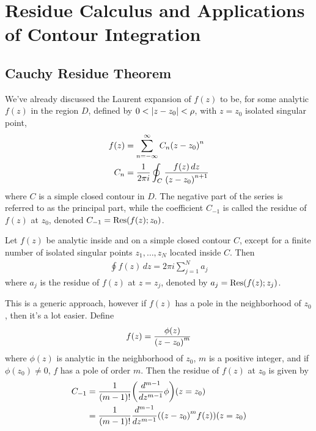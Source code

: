 \section{Residue Calculus and Applications of Contour Integration}
    \subsection{Cauchy Residue Theorem}
    We've already discussed the Laurent expansion of $f(z)$ to be, for some
    analytic $f(z)$ in the region $D$, defined by $0 < \left\lvert z - z_0 \right\rvert < \rho$,
    with $z=z_0$ isolated singular point,
    \begin{align*}
        f(z) &= \sum_{n=-\infty}^\infty C_n {\left( z - z_0 \right)}^n\\
        C_n &= \frac{1}{2\pi i} \oint_C \frac{f(z) \, dz}{{\left( z - z_0 \right)}^{n+1}}
    \end{align*}
    where $C$ is a simple closed contour in $D$. The negative part of the series
    is referred to as the principal part, while the coefficient $C_{-1}$ is
    called the residue of $f(z)$ at $z_0$, denoted $C_{-1} =
    \text{Res}{\left( f(z); z_0 \right)}$.
    \begin{thm}
        Let $f(z)$ be analytic inside and on a simple closed contour $C$, except
        for a finite number of isolated singular points $z_1, \ldots, z_N$
        located inside $C$. Then
        \begin{align*}
            \oint f(z) \, dz = 2 \pi i \sum_{j=1}^N a_j
        \end{align*}
        where $a_j$ is the residue of $f(z)$ at $z=z_j$, denoted by $a_j =
        \text{Res}{\left( f(z); z_j \right)}$.
    \end{thm}
    This is a generic approach, however if $f(z)$ has a pole in the neighborhood
    of $z_0$, then it's a lot easier. Define
    \begin{align*}
        f(z)=\frac{\phi(z)}{{\left( z-z_0 \right)}^m}
    \end{align*}
    where $\phi(z)$ is analytic in the neighborhood of $z_0$, $m$ is a positive
    integer, and if $\phi(z_0) \neq 0$, $f$ has a pole of order $m$. Then the
    residue of $f(z)$ at $z_0$ is given by
    \begin{align*}
        C_{-1} &=
        \frac{1}{{\left( m-1 \right)}!}{\left( 
            \frac{d^{m-1}}{dz^{m-1}}\phi
         \right)}{\left( z=z_0 \right)}\\
        &= \frac{1}{{\left( m-1 \right)}!}\frac{d^{m-1}}{dz^{m-1}}{\left( 
            {\left( z-z_0 \right)}^m f(z)
         \right)}{\left( z=z_0 \right)}
    \end{align*}
